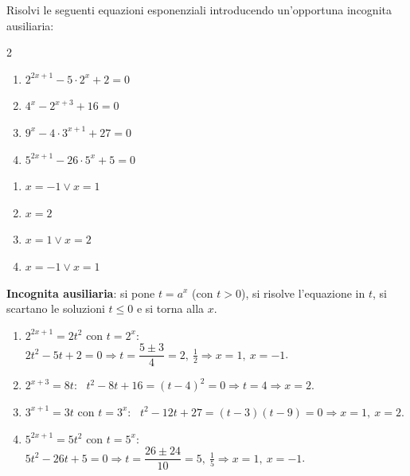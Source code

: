\begin{question}[ID=3.8, subtitle={Equazioni con sostituzione: esponenti traslati}, difficulty=media, tags={equazioni, esponenziali, sostituzione}]
Risolvi le seguenti equazioni esponenziali introducendo un'opportuna incognita ausiliaria:
\begin{center}\begin{minipage}{0.92\linewidth}
\begin{multicols}{2}
\begin{enumerate}[leftmargin=3.2cm]
\item $2^{2x+1} - 5 \cdot 2^{x} + 2 = 0$
\item $4^{x} - 2^{x+3} + 16 = 0$
\item $9^{x} - 4 \cdot 3^{x+1} + 27 = 0$
\item $5^{2x+1} - 26 \cdot 5^{x} + 5 = 0$
\end{enumerate}
\end{multicols}
\end{minipage}\end{center}
\begin{solution}
\begin{enumerate}
    \item $x=-1\vee x=1$
    \item $x=2$
    \item $x=1\vee x=2$
    \item $x=-1\vee x=1$
\end{enumerate}
\end{solution}
\begin{explanation}
\textbf{Incognita ausiliaria}: si pone $t=a^x$ (con $t>0$), si risolve l'equazione in $t$, si scartano le soluzioni $t\leq0$ e si torna alla $x$.
\begin{enumerate}
    \item $2^{2x+1}=2t^2$ con $t=2^x$: \ $2t^2-5t+2=0 \Rightarrow t=\dfrac{5\pm3}{4}=2,\ \tfrac12 \Rightarrow x=1,\ x=-1$.
    \item $2^{x+3}=8t$: \ $t^2-8t+16=(t-4)^2=0 \Rightarrow t=4 \Rightarrow x=2$.
    \item $3^{x+1}=3t$ con $t=3^x$: \ $t^2-12t+27=(t-3)(t-9)=0 \Rightarrow x=1,\ x=2$.
    \item $5^{2x+1}=5t^2$ con $t=5^x$: \ $5t^2-26t+5=0 \Rightarrow t=\dfrac{26\pm24}{10}=5,\ \tfrac15 \Rightarrow x=1,\ x=-1$.
\end{enumerate}
\end{explanation}
\end{question}

